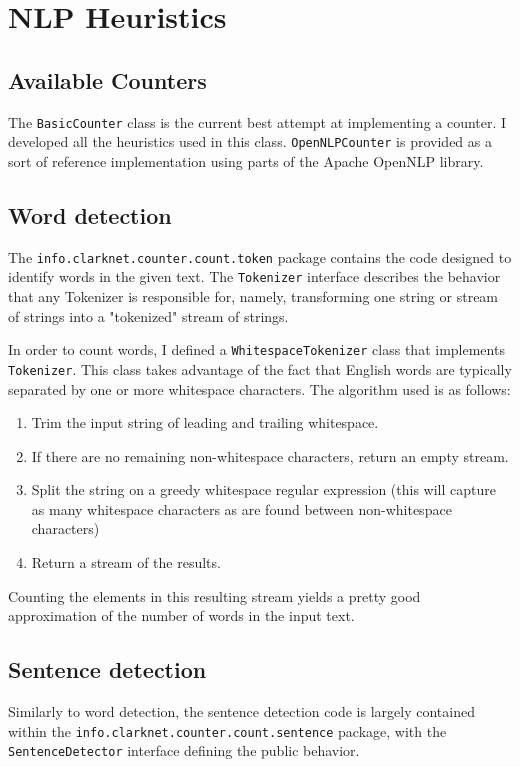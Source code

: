 \documentclass{article}
\begin{document}
\section{NLP Heuristics}

\subsection{Available Counters}
The \texttt{BasicCounter} class is the current best attempt at implementing a counter. I developed all the heuristics used in this class. \texttt{OpenNLPCounter} is provided as a sort of reference implementation using parts of the Apache OpenNLP library.

\subsection{Word detection}
The \texttt{info.clarknet.counter.count.token} package contains the code designed to identify words in the given text. The \texttt{Tokenizer} interface describes the behavior that any Tokenizer is responsible for, namely, transforming one string or stream of strings into a "tokenized" stream of strings.

In order to count words, I defined a \texttt{WhitespaceTokenizer} class that implements \texttt{Tokenizer}. This class takes advantage of the fact that English words are typically separated by one or more whitespace characters. The algorithm used is as follows:
\begin{enumerate}
 \item Trim the input string of leading and trailing whitespace.
 \item If there are no remaining non-whitespace characters, return an empty stream.
 \item Split the string on a greedy whitespace regular expression (this will capture as many whitespace characters as are found between non-whitespace characters)
 \item Return a stream of the results.
\end{enumerate}

Counting the elements in this resulting stream yields a pretty good approximation of the number of words in the input text.

\subsection{Sentence detection}
Similarly to word detection, the sentence detection code is largely contained within the \texttt{info.clarknet.counter.count.sentence} package, with the \texttt{SentenceDetector} interface defining the public behavior.
\end{document}
